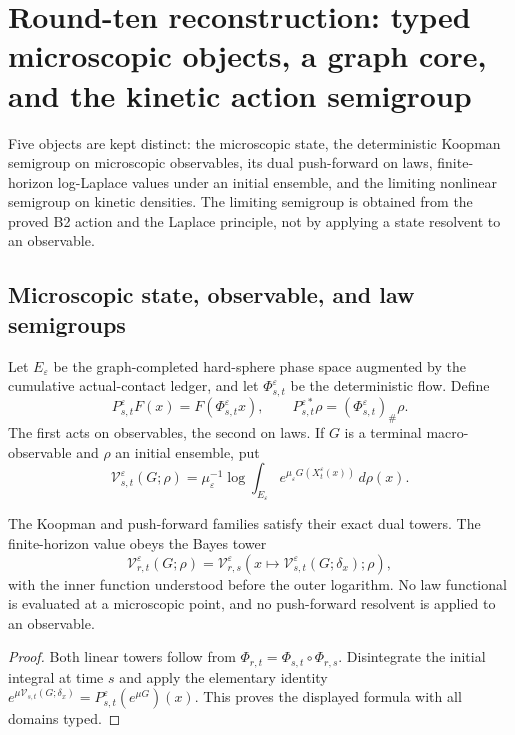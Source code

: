 \section{Round-ten reconstruction: typed microscopic objects, a graph core, and the kinetic action semigroup}
\label{sec:r10-b4}

Five objects are kept distinct: the microscopic state, the deterministic
Koopman semigroup on microscopic observables, its dual push-forward on laws,
finite-horizon log-Laplace values under an initial ensemble, and the limiting
nonlinear semigroup on kinetic densities.  The limiting semigroup is obtained
from the proved B2 action and the Laplace principle, not by applying a state
resolvent to an observable.

\subsection{Microscopic state, observable, and law semigroups}

Let $E_\varepsilon$ be the graph-completed hard-sphere phase space augmented
by the cumulative actual-contact ledger, and let $\Phi_{s,t}^\varepsilon$ be
the deterministic flow.  Define
\[
 P_{s,t}^\varepsilon F(x)=F(\Phi_{s,t}^\varepsilon x),
 \qquad
 P_{s,t}^{\varepsilon *}\rho=(\Phi_{s,t}^\varepsilon)_\#\rho.
\]
The first acts on observables, the second on laws.  If $G$ is a terminal
macro-observable and $\rho$ an initial ensemble, put
\[
 \mathcal V_{s,t}^\varepsilon(G;\rho)
 =\mu_\varepsilon^{-1}
 \log\int_{E_\varepsilon}
 e^{\mu_\varepsilon G(X_t^\varepsilon(x))}\,d\rho(x).
\]

\begin{proposition}
\label{prop:r10-b4-tower}
The Koopman and push-forward families satisfy their exact dual towers.  The
finite-horizon value obeys the Bayes tower
\[
 \mathcal V_{r,t}^\varepsilon(G;\rho)
 =\mathcal V_{r,s}^\varepsilon
 \left(
  x\mapsto
  \mathcal V_{s,t}^\varepsilon(G;\delta_x);
  \rho
 \right),
\]
with the inner function understood before the outer logarithm.  No law
functional is evaluated at a microscopic point, and no push-forward
resolvent is applied to an observable.
\end{proposition}

\begin{proof}
Both linear towers follow from
$\Phi_{r,t}=\Phi_{s,t}\circ\Phi_{r,s}$.  Disintegrate the initial integral at
time $s$ and apply the elementary identity
$e^{\mu\mathcal V_{s,t}(G;\delta_x)}=
 P_{s,t}^\varepsilon(e^{\mu G})(x)$.  This proves the displayed formula with
all domains typed.
\end{proof}

